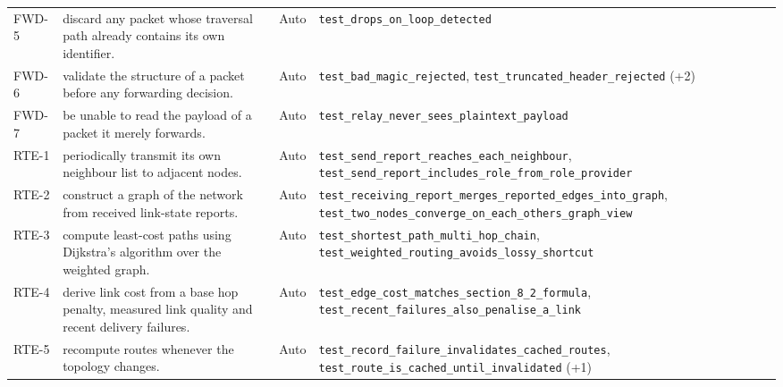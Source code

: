 \begin{longtable}{@{}p{0.95cm}p{6.6cm}p{1.15cm}p{8.6cm}@{}}
FWD-5 & discard any packet whose traversal path already contains its own identifier. & Auto & \texttt{test\_\allowbreak{}drops\_\allowbreak{}on\_\allowbreak{}loop\_\allowbreak{}detected} \\
FWD-6 & validate the structure of a packet before any forwarding decision. & Auto & \texttt{test\_\allowbreak{}bad\_\allowbreak{}magic\_\allowbreak{}rejected}, \texttt{test\_\allowbreak{}truncated\_\allowbreak{}header\_\allowbreak{}rejected} (+2) \\
FWD-7 & be unable to read the payload of a packet it merely forwards. & Auto & \texttt{test\_\allowbreak{}relay\_\allowbreak{}never\_\allowbreak{}sees\_\allowbreak{}plaintext\_\allowbreak{}payload} \\
RTE-1 & periodically transmit its own neighbour list to adjacent nodes. & Auto & \texttt{test\_\allowbreak{}send\_\allowbreak{}report\_\allowbreak{}reaches\_\allowbreak{}each\_\allowbreak{}neighbour}, \texttt{test\_\allowbreak{}send\_\allowbreak{}report\_\allowbreak{}includes\_\allowbreak{}role\_\allowbreak{}from\_\allowbreak{}role\_\allowbreak{}provider} \\
RTE-2 & construct a graph of the network from received link-state reports. & Auto & \texttt{test\_\allowbreak{}receiving\_\allowbreak{}report\_\allowbreak{}merges\_\allowbreak{}reported\_\allowbreak{}edges\_\allowbreak{}into\_\allowbreak{}graph}, \texttt{test\_\allowbreak{}two\_\allowbreak{}nodes\_\allowbreak{}converge\_\allowbreak{}on\_\allowbreak{}each\_\allowbreak{}others\_\allowbreak{}graph\_\allowbreak{}view} \\
RTE-3 & compute least-cost paths using Dijkstra's algorithm over the weighted graph. & Auto & \texttt{test\_\allowbreak{}shortest\_\allowbreak{}path\_\allowbreak{}multi\_\allowbreak{}hop\_\allowbreak{}chain}, \texttt{test\_\allowbreak{}weighted\_\allowbreak{}routing\_\allowbreak{}avoids\_\allowbreak{}lossy\_\allowbreak{}shortcut} \\
RTE-4 & derive link cost from a base hop penalty, measured link quality and recent delivery failures. & Auto & \texttt{test\_\allowbreak{}edge\_\allowbreak{}cost\_\allowbreak{}matches\_\allowbreak{}section\_\allowbreak{}8\_\allowbreak{}2\_\allowbreak{}formula}, \texttt{test\_\allowbreak{}recent\_\allowbreak{}failures\_\allowbreak{}also\_\allowbreak{}penalise\_\allowbreak{}a\_\allowbreak{}link} \\
RTE-5 & recompute routes whenever the topology changes. & Auto & \texttt{test\_\allowbreak{}record\_\allowbreak{}failure\_\allowbreak{}invalidates\_\allowbreak{}cached\_\allowbreak{}routes}, \texttt{test\_\allowbreak{}route\_\allowbreak{}is\_\allowbreak{}cached\_\allowbreak{}until\_\allowbreak{}invalidated} (+1) \\

\end{longtable}
